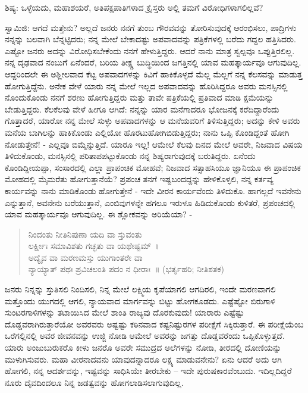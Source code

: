 ಶಿಷ್ಯ: ಒಳ್ಳೆಯದು, ಮಹಾಶಯರೆ, ಅತಿಪಕ್ಷಪಾತಿಗಳಾದ ಕ್ರೈಸ್ತರು ಅಲ್ಲಿ ತಮಗೆ ವಿರೋಧಿಗಳಾಗಲಿಲ್ಲವೆ?

ಸ್ವಾಮಿಜಿ: ಆಗದೆ ಮತ್ತೇನು? ಅಲ್ಲದೆ ಜನರು ನನಗೆ ತುಂಬ ಗೌರವವನ್ನು ತೋರಿಸುವುದಕ್ಕೆ ಆರಂಭಿಸಲು, ಪಾದ್ರಿಗಳು ನನ್ನನ್ನು ಬಲವಾಗಿ ಬೆನ್ನಟ್ಟಿದರು; ನನ್ನ ಮೇಲೆ ಬೇಕಾದಷ್ಟು ಅಪವಾದವನ್ನು ಪತ್ರಿಕೆಗಳಲ್ಲಿ ಬರೆದು ಗದ್ದಲ ಹತ್ತಿಸಿದರು. ಎಷ್ಟೋ ಜನರು ಅದನ್ನು ವಿರೋಧಿಸಬೇಕೆಂದು ನನಗೆ ಹೇಳುತ್ತಿದ್ದರು. ಆದರೆ ನಾನು ಮಾತ್ರ ಸ್ವಲ್ಪವೂ ಒಪ್ಪುತ್ತಿರಲಿಲ್ಲ. ನನ್ನ ದೃಢವಾದ ನಂಬುಗೆ ಏನೆಂದರೆ, ಬರಿಯ ತೀಕ್ಷ್ಣ ಬುದ್ಧಿಯಿಂದ ಜಗತ್ತಿನಲ್ಲಿ ಯಾವ ಮಹತ್ಕಾರ್ಯವೂ ಆಗುವುದಿಲ್ಲ. ಆದ್ದರಿಂದಲೇ ಈ ಅಶ್ಲೀಲವಾದ ಕೆಟ್ಟ ಅಪವಾದಗಳನ್ನು ಕಿವಿಗೆ ಹಾಕಿಕೊಳ್ಳದೆ ಮೆಲ್ಲ ಮೆಲ್ಲಗೆ ನನ್ನ ಕೆಲಸವನ್ನು ಮಾಡುತ್ತ ಹೋಗುತ್ತಿದ್ದೆನು. ಅನೇಕ ವೇಳೆ ಯಾರು ನನ್ನ ಮೇಲೆ ಇಲ್ಲದ ಅಪವಾದವನ್ನು ಹೊರಿಸಿದ್ದರೂ ಅವರು ಮನಸ್ಸಿನಲ್ಲಿ ನೊಂದುಕೊಂಡು ನನಗೆ ಶರಣು ಹೋಗುತ್ತಿದ್ದರು ಮತ್ತು ತಾವೇ ಪತ್ರಿಕೆಯಲ್ಲಿ ಪ್ರತಿವಾದ ಮಾಡಿ ಕ್ಷಮೆಯನ್ನು ಬೇಡುತ್ತಿದ್ದರು. ಕೆಲಕೆಲವು ವೇಳೆ ಹೀಗೂ ಆಗಿದೆ: ನನ್ನನ್ನು ಯಾರ ಮನೆಗಾದರೂ ಭೋಜನಕ್ಕೆ ಕರೆದಿದ್ದಾರೆಂದು ಗೊತ್ತಾದರೆ, ಯಾರೋ ನನ್ನ ಮೇಲೆ ಸುಳ್ಳು ಅಪವಾದಗಳನ್ನು ಆ ಮನೆಯವರಿಗೆ ತಿಳಿಸುತ್ತಿದ್ದರು; ಅದನ್ನು ಕೇಳಿ ಅವರು ಮನೆಯ ಬಾಗಿಲನ್ನು ಹಾಕಿಕೊಂಡು ಎಲ್ಲಿಯೋ ಹೊರಟುಹೋಗಿಬಿಡುತ್ತಿದ್ದರು; ನಾನು ಒಪ್ಪಿ ಕೊಂಡಿದ್ದಂತೆ ಹೋಗಿ ನೋಡುತ್ತೇನೆ! - ಎಲ್ಲವೂ ಬಿಮ್ಮೆನ್ನುತ್ತಿದೆ. ಯಾರೂ ಇಲ್ಲ! ಆಮೇಲೆ ಕೆಲವು ದಿನದ ಮೇಲೆ ಅವರೇ, ನಿಜವಾದ ವಿಷಯ ತಿಳಿದುಕೊಂಡು, ಮನಸ್ಸಿನಲ್ಲಿ ಪರಿತಾಪಪಟ್ಟುಕೊಂಡು ನನ್ನ ಶಿಷ್ಯರಾಗುವುದಕ್ಕೆ ಬರುತಿದ್ದರು. ಏನೆಂದು ಕೊಂಡಿದ್ದೀಯಪ್ಪಾ, ಸಂಸಾರದಲ್ಲಿ ಎಲ್ಲಾ ಪ್ರಾಪಂಚಿಕ ಮೋಹವೆ; ನಿಜವಾದ ಸತ್ಸಾಹಸಿಯೂ ಜ್ಞಾನಿಯೂ ಈ ಪ್ರಾಪಂಚಿಕ ಮೋಹದಲ್ಲಿ ಮೈಮರೆತು ಹೋಗುತ್ತಾನೆಯೆ? ಪ್ರಪಂಚ ತನಗೆ ಇಷ್ಟಬಂದದ್ದನ್ನು ಹೇಳಿಕೊಳ್ಳಲಿ, ನನ್ನ ಕರ್ತವ್ಯ ಕಾರ್ಯವನ್ನು ನಾನು ಮಾಡಿಕೊಂಡು ಹೋಗುತ್ತೇನೆ - ಇದೇ ವೀರನ ಕಾರ್ಯವೆಂದು ತಿಳಿದುಕೊ. ಹಾಗಲ್ಲದೆ ಇವನೇನು ಎನ್ನುತ್ತಾನೆ, ಅವನೇನು ಬರೆಯುತ್ತಾನೆ, ಎಂಬಿವುಗಳನ್ನೇ ಹಗಲೂ ಇರುಳೂ ಹಿಡಿದುಕೊಂಡು ಕುಳಿತರೆ, ಪ್ರಪಂಚದಲ್ಲಿ ಯಾವ ಮಹತ್ಕಾರ್ಯವೂ ಆಗುವುದಿಲ್ಲ. ಈ ಶ್ಲೋಕವನ್ನು ಅರಿಯೆಯಾ? -

\begin{verse}
ನಿಂದಂತು ನೀತಿನಿಪುಣಾ ಯದಿ ವಾ ಸ್ತುವಂತು\\ಲರ್ಕ್ಷೀಃ ಸಮಾವಿಶತು ಗಚ್ಛತು ವಾ ಯಥೇಷ್ಟಮ್~।\\ಅದ್ಯೈವ ವಾ ಮರಣಮಸ್ತು ಯುಗಾಂತರೇ ವಾ\\ನ್ಯಾಯ್ಯಾತ್ ಪಥಃ ಪ್ರವಿಚಲಂತಿ ಪದಂ ನ ಧೀರಾಃ~॥ (ಭರ್ತೃಹರಿ; ನೀತಿಶತಕ)
\end{verse}

ಜನರು ನಿನ್ನನ್ನು ಸ್ತುತಿಸಲಿ ನಿಂದಿಸಲಿ, ನಿನ್ನ ಮೇಲೆ ಲಕ್ಷ್ಮಿಯ ಕೃಪೆಯಾಗಲಿ ಆಗದಿರಲಿ, ಇಂದೇ ಮರಣವಾಗಲಿ ಮತ್ತೊಂದು ಯುಗದಲ್ಲಿ ಆಗಲಿ, ನ್ಯಾಯವಾದ ಮಾರ್ಗವನ್ನು ಬಿಟ್ಟು ಹೋಗಕೂಡದು. ಎಷ್ಟೆಷ್ಟೋ ಬಿರುಗಾಳಿ ಸುಂಟರಗಾಳಿಗಳನ್ನು ತಟಾಯಿಸಿದ ಮೇಲೆ ಶಾಂತಿ ರಾಜ್ಯವು ದೊರಕುವುದು! ಯಾರಾರು ಎಷ್ಟೆಷ್ಟು ದೊಡ್ಡವರಾಗಿರುತ್ತಾರೆಯೋ ಅವರವರು ಅಷ್ಟಷ್ಟು ಕಠಿನವಾದ ಕಷ್ಟನಿಷ್ಟುರಗಳ ಪರೀಕ್ಷೆಗೆ ಸಿಕ್ಕಿರುತ್ತಾರೆ. ಈ ಪರೀಕ್ಷೆಯೆಂಬ ಒರೆಗಲ್ಲಿನಲ್ಲಿ ಅವರ ಜೀವನವನ್ನು ಉಜ್ಜಿ ನೋಡಿ ಆಮೇಲೆ ಅವರನ್ನು ಜಗತ್ತು ದೊಡ್ಡವರೆಂದು ಒಪ್ಪಿಕೊಳ್ಳುತ್ತದೆ. ಯಾರು ಅಂಜುಬುರುಕರೊ ಕೀಳು ಜನರೊ ಅವರೇ ಸಮುದ್ರದ ಅಲೆಗಳನ್ನು ನೋಡಿ, ತೀರದಲ್ಲಿ ದೋಣಿಯನ್ನು ಮುಳುಗಿಸುವರು. ಮಹಾ ವೀರನಾದವನು ಯಾವುದನ್ನಾದರೂ ಲಕ್ಷ್ಯ ಮಾಡುವನೇನು? ಏನು ಆದರೆ ಅದು ಆಗಿ ಹೋಗಲಿ, ನನ್ನ ಆದರ್ಶವನ್ನು, ಇಷ್ಟವನ್ನು ಸಾಧಿಸಿಯೇ ತೀರಬೇಕು – ಇದೇ ಪುರುಷಕಾರವೆಂಬುದು. ಇದಿಲ್ಲದಿದ್ದರೆ ನೂರು ದೈವದಿಂದಲೂ ನಿನ್ನ ಜಡತ್ವವನ್ನು ಹೋಗಲಾಡಿಸಲಾಗುವುದಿಲ್ಲ.

